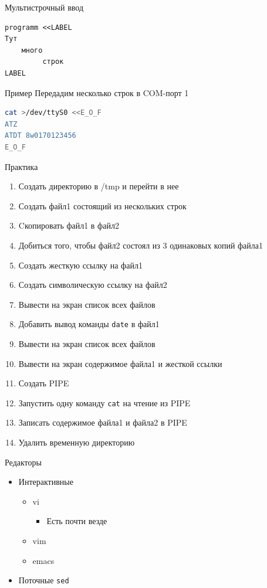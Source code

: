 \documentclass[ignorenonframetext, professionalfonts, hyperref={pdftex, unicode}]{beamer}
\begin{document}
\begin{frame}[fragile]{Мультистрочный ввод}

\begin{verbatim}
programm <<LABEL
Тут
    много
	     строк
LABEL
\end{verbatim}

	\pause
	\begin{block}{Пример}
	Передадим несколько строк в COM-порт 1
\begin{lstlisting}[language=bash]
cat >/dev/ttyS0 <<E_O_F
ATZ
ATDT 8w0170123456
E_O_F
\end{lstlisting}
	\end{block}
\end{frame}





\begin{frame}[fragile]{Практика}
	\begin{enumerate}
		\item Создать директорию в /tmp и перейти в нее
		\item Создать файл1 состоящий из нескольких строк
		\item Cкопировать файл1 в файл2
		\item Добиться того, чтобы файл2 состоял из 3 одинаковых копий файла1
		\item Создать жесткую ссылку на файл1
		\item Создать символическую ссылку на файл2
		\item Вывести на экран список всех файлов
		\item Добавить вывод команды {\tt date} в файл1
		\item Вывести на экран список всех файлов
		\item Вывести на экран содержимое файла1 и жесткой ссылки
		\item Создать PIPE
		\item Запустить одну команду {\tt cat} на чтение из PIPE
		\item Записать содержимое файла1 и файла2 в PIPE
		\item Удалить временную директорию
	\end{enumerate}
\end{frame}

\begin{frame}{Редакторы}
\begin{itemize}
 \item Интерактивные
 \begin{itemize}
 \item vi
   \begin{itemize}
    \item Есть почти везде
   \end{itemize}
 \item vim
 \item emacs
 \end{itemize}
 \item Поточные {\tt sed}
 \end{itemize}
\end{frame}
\end{document}
